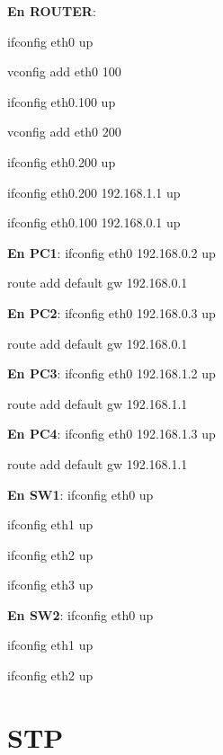 \documentclass{article}
\begin{document}
\textbf{En ROUTER}:

ifconfig eth0 up

vconfig add eth0 100

ifconfig eth0.100 up

vconfig add eth0 200

ifconfig eth0.200 up

ifconfig eth0.200 192.168.1.1 up

ifconfig eth0.100 192.168.0.1 up

\textbf{En PC1}:
ifconfig eth0 192.168.0.2 up

route add default gw 192.168.0.1

\textbf{En PC2}:
ifconfig eth0 192.168.0.3 up

route add default gw 192.168.0.1

\textbf{En PC3}:
ifconfig eth0 192.168.1.2 up

route add default gw 192.168.1.1

\textbf{En PC4}:
ifconfig eth0 192.168.1.3 up

route add default gw 192.168.1.1

\textbf{En SW1}:
ifconfig eth0 up

ifconfig eth1 up

ifconfig eth2 up

ifconfig eth3 up

\textbf{En SW2}:
ifconfig eth0 up

ifconfig eth1 up

ifconfig eth2 up

\section{STP}
\end{document}
